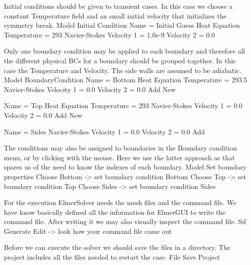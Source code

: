 Initial conditions should be given to transient cases. In this case we choose a constant Temperature field
and an small initial velocity that initializes the symmetry break. 
\ttbegin
Model
  Initial Condition 
    Name = Initial Guess
    Heat Equation
      Temperature = 293
    Navier-Stokes
      Velocity 1 = 1.0e-9
      Velocity 2 = 0.0
\ttend

Only one boundary condition may be applied to each boundary and therefore all the 
different physical BCs for a boundary should be grouped together. In this case the
Temperature and Velocity. The side walls are assumed to be adiabatic.
\ttbegin
Model
  BoundaryCondition
    Name = Bottom
    Heat Equation
      Temperature = 293.5
    Navier-Stokes 
      Velocity 1 = 0.0
      Velocity 2 = 0.0
    Add
    New

    Name = Top
    Heat Equation
      Temperature = 293
    Navier-Stokes 
      Velocity 1 = 0.0
      Velocity 2 = 0.0
    Add 
    New
 
    Name = Sides
    Navier-Stokes 
      Velocity 1 = 0.0
      Velocity 2 = 0.0
    Add
\ttend   

The conditions may also be assigned to boundaries in the Boundary condition menu, or 
by clicking with the mouse. Here we use the latter approach as that spares us of the 
need to know the indexes of each boundary.
\ttbegin
Model
  Set boundary properties
    Choose Bottom -> set boundary condition Bottom
    Choose Top -> set boundary condition Top
    Choose Sides -> set boundary condition Sides
\ttend


For the execution 
ElmerSolver needs the mesh files and the command file. We have know basically defined
all the information for ElmerGUI to write the command file. After writing it we may also visually 
inspect the command file.
\ttbegin
Sif 
  Generate
  Edit -> look how your command file came out  
\ttend

Before we can execute the solver we should save the files in a directory. The project includes
all the files needed to restart the case.
\ttbegin
File 
  Save Project
\ttend


